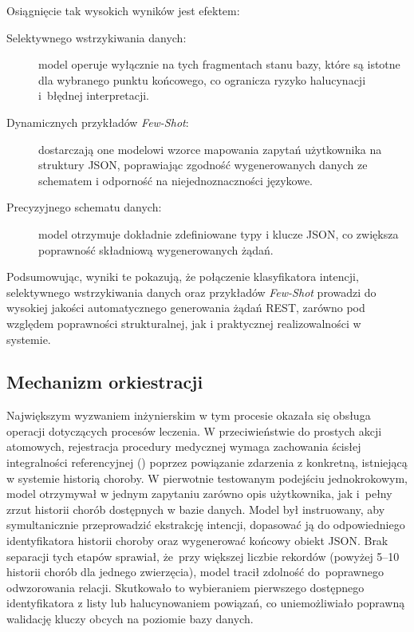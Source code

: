 Osiągnięcie tak wysokich wyników jest efektem:
\begin{description}
    \item[Selektywnego wstrzykiwania danych:] model operuje wyłącznie na tych fragmentach stanu bazy, które są istotne dla wybranego punktu końcowego, co ogranicza ryzyko halucynacji i~błędnej interpretacji.
    \item[Dynamicznych przykładów \textit{Few-Shot}:] dostarczają one modelowi wzorce mapowania zapytań użytkownika na struktury JSON, poprawiając zgodność wygenerowanych danych ze schematem i odporność na niejednoznaczności językowe.
    \item[Precyzyjnego schematu danych:] model otrzymuje dokładnie zdefiniowane typy i klucze JSON, co zwiększa poprawność składniową wygenerowanych żądań.
\end{description}

Podsumowując, wyniki te pokazują, że połączenie klasyfikatora intencji, selektywnego wstrzykiwania danych oraz przykładów \textit{Few-Shot} prowadzi do wysokiej jakości automatycznego generowania żądań REST, zarówno pod względem poprawności strukturalnej, jak i praktycznej realizowalności w systemie.

\subsection{Mechanizm orkiestracji}

Największym wyzwaniem inżynierskim w tym procesie okazała się obsługa operacji dotyczących procesów leczenia. W przeciwieństwie do prostych akcji atomowych, rejestracja procedury medycznej wymaga zachowania ścisłej integralności referencyjnej () poprzez powiązanie zdarzenia z konkretną, istniejącą w systemie historią choroby. W pierwotnie testowanym podejściu jednokrokowym, model otrzymywał w jednym zapytaniu zarówno opis użytkownika, jak i~pełny zrzut historii chorób dostępnych w bazie danych. Model był instruowany, aby symultanicznie przeprowadzić ekstrakcję intencji, dopasować ją do odpowiedniego identyfikatora historii choroby oraz wygenerować końcowy obiekt JSON. Brak separacji tych etapów sprawiał, że~przy większej liczbie rekordów (powyżej 5--10 historii chorób dla jednego zwierzęcia), model tracił zdolność do~poprawnego odwzorowania relacji. Skutkowało to wybieraniem pierwszego dostępnego identyfikatora z listy lub halucynowaniem powiązań, co uniemożliwiało poprawną walidację kluczy obcych na poziomie bazy danych.

